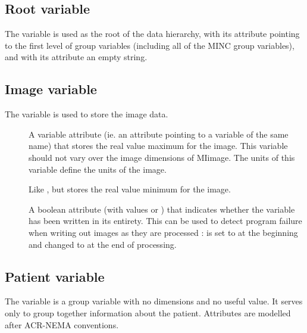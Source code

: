 \subsection{Root variable}

The variable  is used as the root of the data
hierarchy, with its  attribute pointing to the first
level of group variables (including all of the MINC group variables),
and with its  attribute an empty string.

\subsection{Image variable}

The variable  is used to store the image data. 

\begin{description}
   \item [] A variable attribute (ie. an attribute
      pointing to a variable of the same name) that stores the real
      value maximum for the image. This variable should not vary over
      the image dimensions of MIimage. The units of this variable
      define the units of the image.
   \item [] Like , but stores the
      real value minimum for the image.
   \item [] A boolean attribute (with values
       or ) that indicates whether the variable
      has been written in its entirety. This can be used to detect
      program failure when writing out images as they are processed :
       is set to  at the beginning and
      changed to  at the end of processing.
\end{description}

\subsection{Patient variable}

The variable  is a group variable with no dimensions
and no useful value. It serves only to group together information
about the patient. Attributes are modelled after ACR-NEMA conventions.


